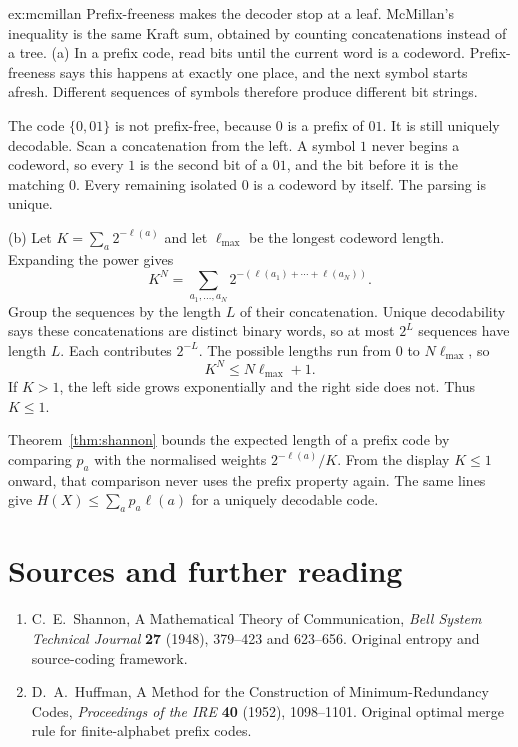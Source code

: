 \begin{solution}{ex:mcmillan}
\idea Prefix-freeness makes the decoder stop at a leaf. McMillan's inequality is the same Kraft sum, obtained by counting concatenations instead of a tree.
\writeup (a) In a prefix code, read bits until the current word is a codeword. Prefix-freeness says this happens at exactly one place, and the next symbol starts afresh. Different sequences of symbols therefore produce different bit strings.

The code $\{0,01\}$ is not prefix-free, because $0$ is a prefix of $01$. It is still uniquely decodable. Scan a concatenation from the left. A symbol $1$ never begins a codeword, so every $1$ is the second bit of a $01$, and the bit before it is the matching $0$. Every remaining isolated $0$ is a codeword by itself. The parsing is unique.

(b) Let $K=\sum_a 2^{-\ell(a)}$ and let $\ell_{\max}$ be the longest codeword length. Expanding the power gives
\[
 K^N=\sum_{a_1,\ldots,a_N}2^{-(\ell(a_1)+\cdots+\ell(a_N))}.
\]
Group the sequences by the length $L$ of their concatenation. Unique decodability says these concatenations are distinct binary words, so at most $2^L$ sequences have length $L$. Each contributes $2^{-L}$. The possible lengths run from $0$ to $N\ell_{\max}$, so
\[
 K^N\le N\ell_{\max}+1.
\]
If $K>1$, the left side grows exponentially and the right side does not. Thus $K\le1$.

Theorem~\ref{thm:shannon} bounds the expected length of a prefix code by comparing $p_a$ with the normalised weights $2^{-\ell(a)}/K$. From the display $K\le1$ onward, that comparison never uses the prefix property again. The same lines give $H(X)\le\sum_a p_a\ell(a)$ for a uniquely decodable code.
\end{solution}

\section*{Sources and further reading}

\begin{enumerate}
\item C.~E.~Shannon, A Mathematical Theory of Communication, \emph{Bell System Technical Journal} \textbf{27} (1948), 379--423 and 623--656. Original entropy and source-coding framework.
\item D.~A.~Huffman, A Method for the Construction of Minimum-Redundancy Codes, \emph{Proceedings of the IRE} \textbf{40} (1952), 1098--1101. Original optimal merge rule for finite-alphabet prefix codes.
\end{enumerate}
